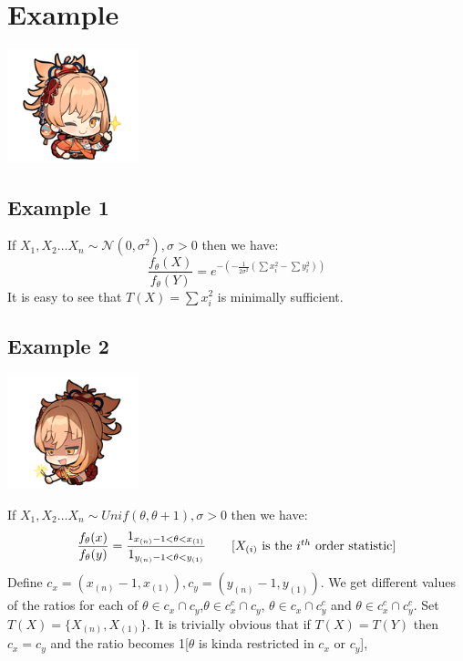 \documentclass[oneside]{book}
\begin{document}
\section{Example}
\begin{marginfigure}%
    \includegraphics[width=1.5in]{chibis/file_021.png}
\end{marginfigure}%
\subsection{Example 1}
If $X_1,X_2\hdots X_n\sim \mathcal N(0,\sigma^2),\sigma>0$ then we have:
$$\frac{f_\theta(X)}{f_\theta(Y)}=e^{-\left(-\frac{1}{2\sigma^2}\left(\sum x_i^2-\sum y_i^2\right)\right)}$$
It is easy to see that $T(X)=\sum x_i^2$ is minimally sufficient.
\subsection{Example 2}
\begin{marginfigure}%
    \includegraphics[width=1.5in]{chibis/file_022.png}
\end{marginfigure}%
If $X_1,X_2\hdots X_n\sim Unif(\theta,\theta+1),\sigma>0$ then we have:
\begin{align*}
    \frac{f_\theta(x)}{f_\theta(y)}=\frac{1_{x_{(n)}-1<\theta<x_{(1)}}}{1_{y_{(n)}-1<\theta<y_{(1)}}}
    \tag*{\text{[$X_{(i)}$ is the $i^{th}$ order statistic]}}
\end{align*}
Define $c_x=(x_{(n)}-1,x_{(1)}),c_y=(y_{(n)}-1,y_{(1)})$. We get different values of the ratios for each of $\theta\in c_x\cap c_y$,$\theta\in c_x^c\cap c_y$, $\theta\in c_x\cap c_y^c$ and $\theta\in c_x^c\cap c_y^c$. Set $T(X)=\{X_{(n)},X_{(1)}\}$. It is trivially obvious that if $T(X)=T(Y)$ then $c_x=c_y$ and the ratio becomes 1[$\theta$ is kinda restricted in $c_x$ or $c_y$], 
\end{document}
